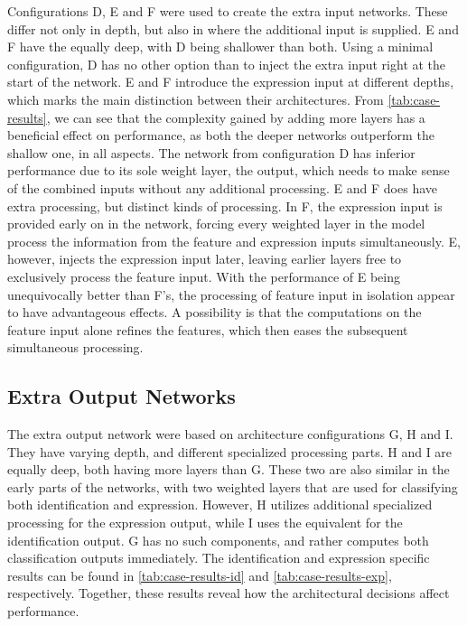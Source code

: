 Configurations D, E and F were used to create the extra input networks. These differ not only in depth, but also in where the additional input is supplied. E and F have the equally deep, with D being shallower than both. Using a minimal configuration, D has no other option than to inject the extra input right at the start of the network. E and F introduce the expression input at different depths, which marks the main distinction between their architectures. From \autoref{tab:case-results}, we can see that the complexity gained by adding more layers has a beneficial effect on performance, as both the deeper networks outperform the shallow one, in all aspects. The network from configuration D has inferior performance due to its sole weight layer, the output, which needs to make sense of the combined inputs without any additional processing. E and F does have extra processing, but distinct kinds of processing. In F, the expression input is provided early on in the network, forcing every weighted layer in the model process the information from the feature and expression inputs simultaneously. E, however, injects the expression input later, leaving earlier layers free to exclusively process the feature input. With the performance of E being unequivocally better than F's, the processing of feature input in isolation appear to have advantageous effects. A possibility is that the computations on the feature input alone refines the features, which then eases the subsequent simultaneous processing. 

\subsection{Extra Output Networks}

The extra output network were based on architecture configurations G, H and I. They have varying depth, and different specialized processing parts. H and I are equally deep, both having more layers than G. These two are also similar in the early parts of the networks, with two weighted layers that are used for classifying both identification and expression. However, H utilizes additional specialized processing for the expression output, while I uses the equivalent for the identification output. G has no such components, and rather computes both classification outputs immediately. The identification and expression specific results can be found in \autoref{tab:case-results-id} and \autoref{tab:case-results-exp}, respectively. Together, these results reveal how the architectural decisions affect performance. \\

